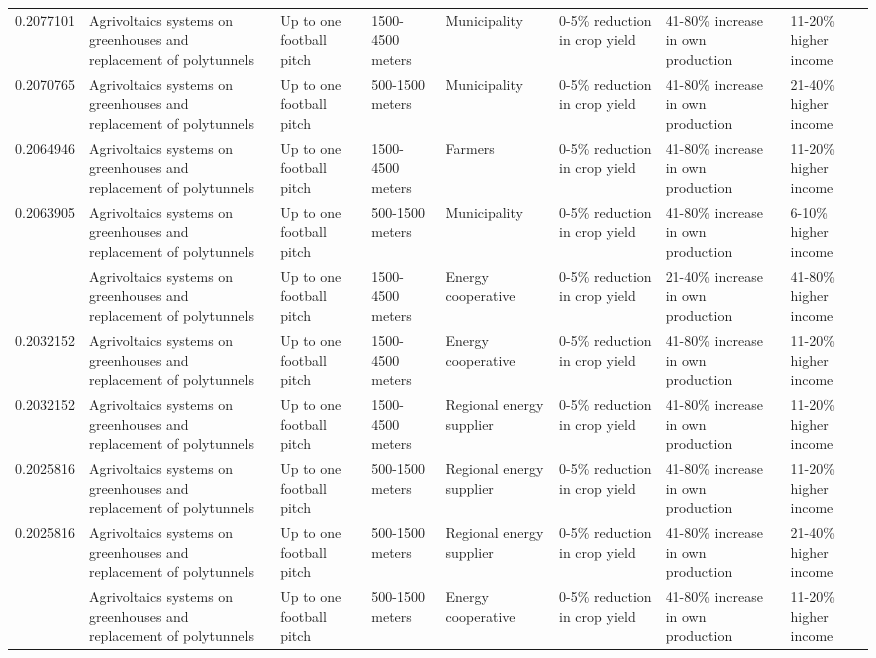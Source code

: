 \begin{table}
\begin{tabular}[t]{rlllllll}
0.2077101 & Agrivoltaics systems on greenhouses
and replacement of polytunnels & Up to one football pitch & 1500-4500 meters & Municipality & 0-5\% reduction in crop yield & 41-80\% increase in own production & 11-20\% higher income\\
0.2070765 & Agrivoltaics systems on greenhouses
and replacement of polytunnels & Up to one football pitch & 500-1500 meters & Municipality & 0-5\% reduction in crop yield & 41-80\% increase in own production & 21-40\% higher income\\
0.2064946 & Agrivoltaics systems on greenhouses
and replacement of polytunnels & Up to one football pitch & 1500-4500 meters & Farmers & 0-5\% reduction in crop yield & 41-80\% increase in own production & 11-20\% higher income\\
0.2063905 & Agrivoltaics systems on greenhouses
and replacement of polytunnels & Up to one football pitch & 500-1500 meters & Municipality & 0-5\% reduction in crop yield & 41-80\% increase in own production & 6-10\% higher income\\
\addlinespace
0.2038461 & Agrivoltaics systems on greenhouses
and replacement of polytunnels & Up to one football pitch & 1500-4500 meters & Energy cooperative & 0-5\% reduction in crop yield & 21-40\% increase in own production & 41-80\% higher income\\
0.2032152 & Agrivoltaics systems on greenhouses
and replacement of polytunnels & Up to one football pitch & 1500-4500 meters & Energy cooperative & 0-5\% reduction in crop yield & 41-80\% increase in own production & 11-20\% higher income\\
0.2032152 & Agrivoltaics systems on greenhouses
and replacement of polytunnels & Up to one football pitch & 1500-4500 meters & Regional energy supplier & 0-5\% reduction in crop yield & 41-80\% increase in own production & 11-20\% higher income\\
0.2025816 & Agrivoltaics systems on greenhouses
and replacement of polytunnels & Up to one football pitch & 500-1500 meters & Regional energy supplier & 0-5\% reduction in crop yield & 41-80\% increase in own production & 11-20\% higher income\\
0.2025816 & Agrivoltaics systems on greenhouses
and replacement of polytunnels & Up to one football pitch & 500-1500 meters & Regional energy supplier & 0-5\% reduction in crop yield & 41-80\% increase in own production & 21-40\% higher income\\
\addlinespace
0.2025816 & Agrivoltaics systems on greenhouses
and replacement of polytunnels & Up to one football pitch & 500-1500 meters & Energy cooperative & 0-5\% reduction in crop yield & 41-80\% increase in own production & 11-20\% higher income\\

\end{tabular}
\end{table}
